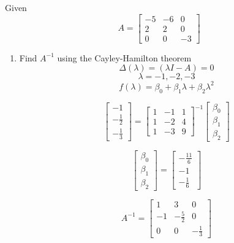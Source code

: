 \item Given
  \begin{equation}
    A = \begin{bmatrix}
-5 & -6 & 0\\
2 & 2 & 0\\
0 & 0 & -3
\end{bmatrix}
\end{equation}
  \begin{enumerate}
  \item Find $A^{-1}$ using the Cayley-Hamilton theorem \\
    \begin{equation}
      \Delta(\lambda) = (\lambda I - A) = 0
    \end{equation}
    \begin{equation}
      \lambda = -1, -2, -3
    \end{equation}
    \begin{equation}
f(\lambda) = \beta_0 + \beta_1\lambda + \beta_2\lambda^2\end{equation}

\begin{equation}
\left[\begin{matrix}-1\\- \frac{1}{2}\\- \frac{1}{3}\end{matrix}\right] = \left[\begin{matrix}1 & -1 & 1\\1 & -2 & 4\\1 & -3 & 9\end{matrix}\right]^{-1}\begin{bmatrix}\beta_0 \\ \beta_1 \\ \beta_2 \end{bmatrix}\end{equation}

\begin{equation}
\begin{bmatrix}\beta_0 \\ \beta_1 \\ \beta_2 \end{bmatrix} = \left[\begin{matrix}- \frac{11}{6}\\-1\\- \frac{1}{6}\end{matrix}\right]\end{equation}

\begin{equation}
A^{-1} = \left[\begin{matrix}1 & 3 & 0\\-1 & - \frac{5}{2} & 0\\0 & 0 & - \frac{1}{3}\end{matrix}\right]\end{equation}


\end{enumerate}
